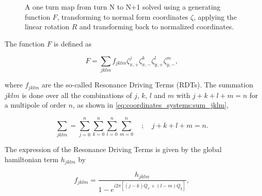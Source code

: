 \begin{figure}[H]
    \centering
    \caption{A one turn map from turn N to N+1 solved using a generating function $F$, 
    transforming to normal form coordinates $\zeta$, applying the linear rotation $R$ and
    transforming back to normalized coordinates.}
    \label{fig:coordinate_systems:non_linear_map_normal_form}
\end{figure}

The function $F$ is defined as

\begin{equation}
    F = \sum_{jklm} f_{jklm}\zeta_{x,+}^j \zeta_{x,-}^k \zeta_{y,+}^l \zeta_{y,-}^m,
\end{equation}

where $f_{jklm}$ are the so-called Resonance Driving Terms (RDTs).  The summation $jklm$ is done
over all the combinations of $j$, $k$, $l$ and $m$ with $j+k+l+m = n$ for a multipole of order $n$,
as shown in \cref{eq:coordinates_systems:sum_jklm},

\begin{equation}
    \sum_{jklm} = \sum_{j=0}^n \sum_{k=0}^n \sum_{l=0}^n \sum_{m=0}^n \quad;\quad j+k+l+m=n.
    \label{eq:coordinates_systems:sum_jklm}
\end{equation}

The expression of the Resonance Driving Terms is given by the global hamiltonian term $h_{jklm}$ by

\begin{equation}
    f_{jklm} = \frac{h_{jklm}}{1 - e^{i2\pi \left[ (j-k)Q_x + (l-m) Q_y \right]}},
    \label{eq:coordinate_systems:fjklm}
\end{equation}

